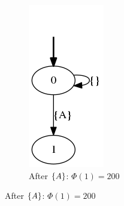 \begin{example}
\begin{figure}[h!]
\begin{subfigure}[b]{0.2\textwidth}
			\includegraphics[width=\textwidth]{images/on-the-fly-example-eve/step4.png}
			\caption{After $\{A\}$: $\Phi(1)=200$}
			\label{on-the-fly-example-eve/step4}
		\end{subfigure}
		

\end{figure}
\end{example}
